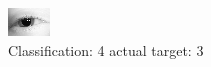 \begin{figure}[h!]
\begin{center}
\includegraphics[width=0.60\columnwidth]{figures/ID54_class_4_target_3.png}
\end{center}
\caption{ Classification: 4 actual target: 3}
\label{fig:ID54_class_4_target_3}
\end{figure}
